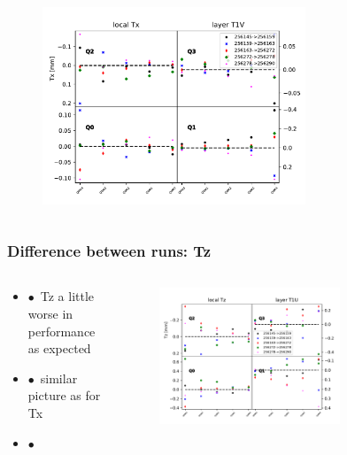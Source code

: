 \documentclass[aspectratio=1610, 12pt]{beamer}
\begin{document}
\begin{frame}
\begin{columns}
\begin{column}[c]{0.48\textwidth}
\begin{figure}
          \includegraphics[width=0.7\textwidth]{plots/stability_plots/diff_reduced_Tx_T1V_Tx.pdf}
        \end{figure}
      \end{column}
  \end{columns}
\end{frame}

\begin{frame}\frametitle{Difference between runs: Tz}
  \begin{columns}
    \begin{column}[c]{0.48\textwidth}
      \begin{itemize}
        \item $\bullet$\, Tz a little worse in performance as expected
        \item $\bullet$\, similar picture as for Tx
        \item $\bullet$\,
      \end{itemize}
    \end{column}
    \begin{column}[c]{0.48\textwidth}
      \begin{figure}
        \includegraphics[width=0.7\textwidth]{plots/stability_plots/diff_reduced_Tz_T1U_Tz.pdf}
      \end{figure}
    \end{column}
  \end{columns}
\end{frame}
\end{document}
